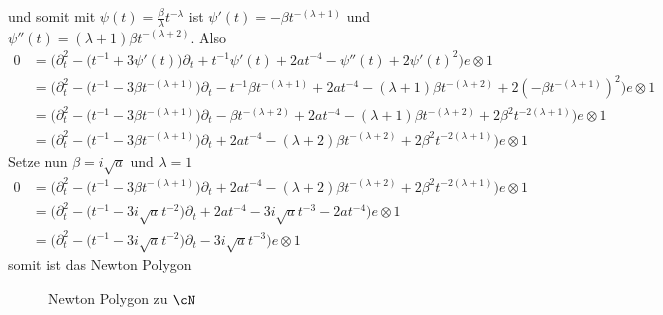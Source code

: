 \begin{try}
\begin{comment}
\caption{Newton Polygon zu $\cN$}
\begin{center}
\fbox{
  \begin{tikzpicture}[scale=0.5,descr/.style={fill=white,inner sep=2.5pt}]
  \def\myPoints{0/-4,0/2,1/-2,1/0,2/-2}
  \def\myPath{ -- node[descr]{$1$} (2,-2)}
  \myPlotFunction{\myPoints}{\myPath}{2}{-4}{2}{$N(\rho^*P_{\phi_1})$}
  \end{tikzpicture}
}
\end{center}
\end{figure}
\end{try}
\end{comment}
\begin{try}
und somit mit $\psi(t)=\frac{\beta}{\lambda}t^{-\lambda}$ ist 
$\psi'(t)=-\beta t^{-(\lambda+1)}$ und
$\psi''(t)=(\lambda+1)\beta t^{-(\lambda+2)}$. Also
\begin{align*}
0 &= \Big(\partial_t^2 - \big(t^{-1} + 3\psi'(t)\big)\partial_t
   + t^{-1} \psi'(t) + 2at^{-4} -\psi''(t)
   + 2 \psi'(t)^2\Big) e\otimes 1
\\&= \Big(\partial_t^2 - \big(t^{-1} - 3\beta t^{-(\lambda+1)}\big)\partial_t
   - t^{-1} \beta t^{-(\lambda+1)} + 2at^{-4} - (\lambda+1)\beta
   t^{-(\lambda+2)}
   + 2 (-\beta t^{-(\lambda+1)})^2\Big) e\otimes 1
\\&= \Big(\partial_t^2 - \big(t^{-1} - 3\beta t^{-(\lambda+1)}\big)\partial_t
   - \beta t^{-(\lambda+2)} + 2at^{-4} - (\lambda+1)\beta t^{-(\lambda+2)}
   + 2 \beta^2 t^{-2(\lambda+1)}\Big) e\otimes 1
\\&= \Big(\partial_t^2 - \big(t^{-1} - 3\beta t^{-(\lambda+1)}\big)\partial_t
   + 2at^{-4} - (\lambda+2)\beta t^{-(\lambda+2)}
   + 2 \beta^2 t^{-2(\lambda+1)}\Big) e\otimes 1
\end{align*}
Setze nun $\beta=i\sqrt{a}$ und $\lambda=1$
\begin{align*}
0 &= \Big(\partial_t^2 - \big(t^{-1} - 3\beta t^{-(\lambda+1)}\big)\partial_t
   + 2at^{-4} - (\lambda+2)\beta t^{-(\lambda+2)}
   + 2 \beta^2 t^{-2(\lambda+1)}\Big) e\otimes 1
\\&= \Big(\partial_t^2 - \big(t^{-1} - 3i\sqrt{a}
    t^{-2}\big)\partial_t
   + 2at^{-4} - 3i\sqrt{a} t^{-3}
   - 2a t^{-4}\Big) e\otimes 1
\\&= \Big(\partial_t^2 - \big(t^{-1} - 3i\sqrt{a} t^{-2}\big)\partial_t
   - 3i\sqrt{a} t^{-3} \Big) e\otimes 1
\end{align*}
somit ist das Newton Polygon
\begin{figure}[H]
\caption{Newton Polygon zu $\cN$}
\begin{center}
\end{center}
\end{figure}
\end{try}
\end{try}


